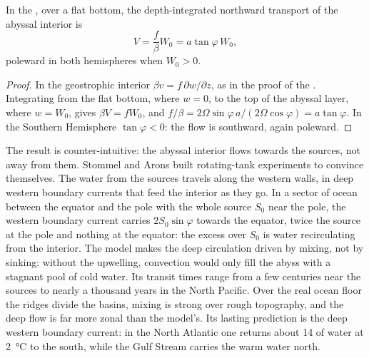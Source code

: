 \begin{proposition}\label{prop:b3:ocean-dynamics:abyssal}
In the , over a flat bottom, the depth-integrated
northward transport of the abyssal interior is
\[
V = \frac{f}{\beta}W_0 = a\tan\varphi\,W_0 ,
\]
poleward in both hemispheres when $W_0 > 0$.
\end{proposition}

\begin{proof}
In the geostrophic interior $\beta v = f\,\partial w/\partial z$, as in the
proof of the . Integrating from the flat bottom, where
$w = 0$, to the top of the abyssal layer, where $w = W_0$, gives $\beta V =
fW_0$, and $f/\beta = 2\Omega\sin\varphi\,a/(2\Omega\cos\varphi) =
a\tan\varphi$. In the Southern Hemisphere $\tan\varphi < 0$: the flow is
southward, again poleward.
\end{proof}

The result is counter-intuitive: the abyssal interior flows towards the
sources, not away from them. Stommel and Arons built rotating-tank
experiments to convince themselves. The water from the sources travels
along the western walls, in deep western boundary currents that feed the
interior as they go. In a sector of ocean between the equator and the pole
with the whole source $S_0$ near the pole, the western boundary current
carries $2S_0\sin\varphi$ towards the equator, twice the source at the pole
and nothing at the equator: the excess over $S_0$ is water recirculating
from the interior. The model makes the deep circulation driven by mixing,
not by sinking: without the upwelling, convection would only fill the
abyss with a stagnant pool of cold water. Its transit times range from a
few centuries near the sources to nearly a thousand years in the North
Pacific. Over the real ocean floor the ridges divide the basins, mixing is
strong over rough topography, and the deep flow is far more zonal than the
model's. Its lasting prediction is the deep western boundary current: in
the North Atlantic one returns about \qty{14}{\sverdrup} of water at
\qty{2}{\celsius} to the south, while the Gulf Stream carries the warm
water north.


